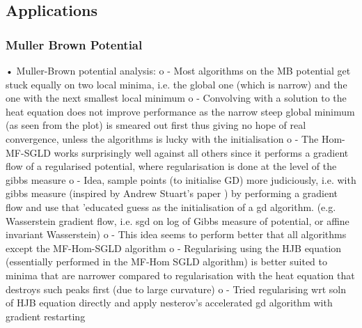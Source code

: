 \documentclass{article}
\begin{document}
\subsection{Applications}

\subsubsection{Muller Brown Potential}

•	Muller-Brown potential analysis:
o	- Most algorithms on the MB potential get stuck equally on two local minima, i.e. the global one (which is narrow) and the one with the next smallest local minimum
o	- Convolving with a solution to the heat equation does not improve performance as the narrow steep global minimum (as seen from the plot) is smeared out first thus giving no hope of real convergence, unless the algorithms is lucky with the initialisation
o	- The Hom-MF-SGLD works surprisingly well against all others since it performs a gradient flow of a regularised potential, where regularisation is done at the level of the gibbs measure
o	- Idea, sample points (to initialise GD) more judiciously, i.e. with gibbs measure (inspired by Andrew Stuart's paper ) by performing a gradient flow and use that 'educated guess as the initialisation of a gd algorithm. (e.g. Wasserstein gradient flow, i.e. sgd on log of Gibbs measure of potential, or affine invariant Wasserstein)
o	- This idea seems to perform better that all algorithms except the MF-Hom-SGLD algorithm
o	- Regularising using the HJB equation (essentially performed in the MF-Hom SGLD algorithm) is better suited to minima that are narrower compared to regularisation with the heat equation that destroys such peaks first (due to large curvature)
o	- Tried regularising wrt soln of HJB equation directly and apply nesterov's accelerated gd algorithm with gradient restarting
\end{document}
